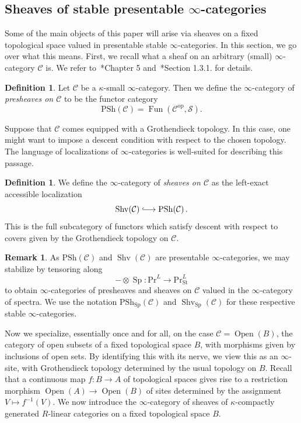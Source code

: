 \documentclass[10pt]{amsart}
\newcommand{\longto}{\longrightarrow}
\theoremstyle{plain}
\theoremstyle{definition}
\newtheorem{definition}[theorem]{Definition}
\newtheorem{rmk}[theorem]{Remark}
\DeclareMathOperator{\Shv}{Shv}
\DeclareMathOperator{\Sp}{Sp}
\DeclareMathOperator{\Fun}{Fun}
\DeclareMathOperator{\Pre}{Pre}
\DeclareMathOperator{\Open}{Open}
\newcommand{\St}{\mathrm{St}}
\newcommand{\oop}{\mathrm{op}}
\newcommand{\cC}{\mathcal{C}}
\newcommand{\cS}{\mathcal{S}}
\begin{document}
\subsection{Sheaves of stable presentable $\infty$-categories}

Some of the main objects of this paper will arise via sheaves on a fixed topological space valued in presentable stable $\infty$-categories.
In this section, we go over what this means.
First, we recall what a sheaf on an arbitrary (small) $\infty$-category $\cC$ is.
We refer to~\cite{HTT}*{Chapter 5} and~\cite{SAG}*{Section 1.3.1.} for details.

\begin{definition}
    Let $\cC$ be a $\kappa$-small $\infty$-category. Then we define the $\infty$-category of \emph{presheaves on $\cC$} to be the functor category
    \[
    \mathrm{PSh}(\cC) = \Fun(\cC^{\oop}, \cS).
    \]
\end{definition}

Suppose that $\cC$ comes equipped with a Grothendieck topology.
In this case, one might want to impose a descent condition with respect to the chosen topology.
The language of localizations of $\infty$-categories is well-suited for describing this passage.

\begin{definition}
    We define the $\infty$-category of \emph{sheaves on $\cC$} as the left-exact accessible localization
\[
\Shv(\cC) \lhook\joinrel\longrightarrow \mathrm{PSh}(\cC) \,.
\]
This is the full subcategory of functors which satisfy descent with respect to covers given by the Grothendieck topology on $\cC$.
\end{definition}

\begin{rmk}
As  $\mathrm{PSh}(\cC)$ and $\Shv(\cC)$ are presentable $\infty$-categories, we may stabilize by tensoring along
$$
- \otimes \Sp: \mathrm{Pr}^{L} \longto \mathrm{Pr}^{L}_{\St}
$$
to obtain $\infty$-categories of presheaves and sheaves on $\cC$ valued in the $\infty$-category of spectra.
We use the notation  $\mathrm{PSh}_{\Sp}(\cC)$ and $\Shv_{\Sp}(\cC)$ for these respective stable $\infty$-categories.
\end{rmk}

Now we specialize, essentially once and for all, on the case $\cC = \Open(B)$, the category of open subsets of a fixed topological space $B$, with morphisms given by inclusions of open sets.
By identifying this with its nerve, we view this as an $\infty$-site, with Grothendieck topology determined by the usual topology on $B$.
Recall that a continuous map $f : B \to A$ of topological spaces gives rise to a restriction morphism $\Open(A) \to \Open(B)$ of sites determined by the assignment $V \mapsto f^{-1}(V)$.
We now introduce the $\infty$-category of sheaves of $\kappa$-compactly generated $R$-linear categories on a fixed topological space $B$.
\end{document}
